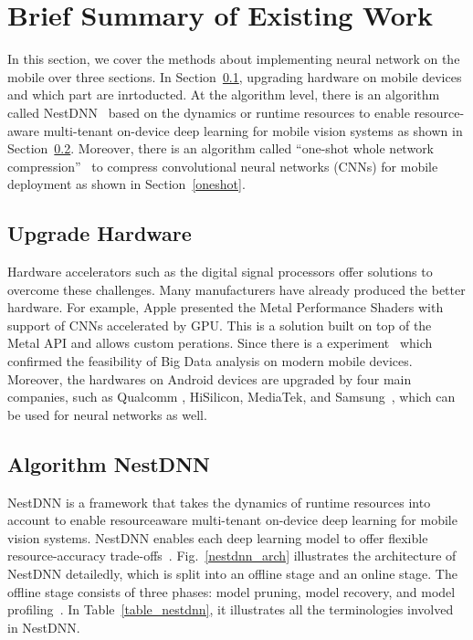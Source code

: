 \documentclass{article}
\begin{document}
\section*{Brief Summary of Existing Work}

In this section, we cover the methods about implementing neural network on the mobile over three sections. In Section~\ref{upgrade_hardware}, upgrading hardware on mobile devices and which part are inrtoducted. At the algorithm level, there is an algorithm called NestDNN~\cite{fang2018nestdnn} based on the dynamics or runtime resources to enable resource-aware multi-tenant on-device deep learning for mobile vision systems as shown in Section~\ref{nestdnn}. Moreover, there is an algorithm called “one-shot whole network compression”~\cite{kim2016compression} to compress convolutional neural networks (CNNs) for mobile deployment as shown in Section~\ref{oneshot}.

\subsection{Upgrade Hardware}\label{upgrade_hardware}
Hardware accelerators such as the digital signal processors offer solutions to overcome these challenges. Many manufacturers have already produced the better hardware. For example, Apple presented the Metal Performance Shaders with support of CNNs accelerated by GPU. This is a solution built on top of the Metal API and allows custom perations. Since there is a experiment~\cite{akusok2019metal} which confirmed the feasibility of Big Data analysis on modern mobile devices. Moreover, the hardwares on Android devices are upgraded by four main companies, such as Qualcomm , HiSilicon, MediaTek, and Samsung~\cite{Andrey2019Aibenchmark}, which can be used for neural networks as well.

\subsection{Algorithm NestDNN}\label{nestdnn}
NestDNN is a framework that takes the dynamics of runtime resources into account to enable resourceaware multi-tenant on-device deep learning for mobile vision systems. NestDNN enables each deep learning model to offer flexible resource-accuracy trade-offs~\cite{fang2018nestdnn}. Fig.~\ref{nestdnn_arch} illustrates the architecture of NestDNN detailedly, which is split into an offline stage and an online stage. The offline stage consists of three phases: model pruning, model recovery, and model profiling~\cite{fang2018nestdnn}. In Table~\ref{table_nestdnn}, it illustrates all the terminologies involved in NestDNN.
\end{document}
